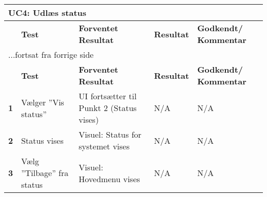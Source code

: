 
\begin{center}
\begin{longtable}{|p{}|p{}|p{}|p{}|p{}|} %
\hline
\multicolumn{5}{|l|}{\textbf{UC4: Udlæs status}} \\ \hline
\multicolumn{1}{|c|}{} &
\textbf{Test} &
\textbf{Forventet \newline Resultat} &
\textbf{Resultat} &
\textbf{Godkendt/ \newline Kommentar} \\ \hline 
\endfirsthead

\multicolumn{5}{l}{...fortsat fra forrige side} \\ \hline 
\multicolumn{1}{|c|}{} &
\textbf{Test} &
\textbf{Forventet \newline Resultat} &
\textbf{Resultat} &
\textbf{Godkendt/ \newline Kommentar} \\ \hline 
\endhead


\textbf{1} &
Vælger ''Vis status'' &
UI fortsætter til Punkt 2 (Status vises) &
N/A &
N/A \\\hline
\textbf{2} &
Status vises &
Visuel: Status for systemet vises &
N/A &
N/A \\\hline
\textbf{3} &
Vælg ''Tilbage'' fra status &
Visuel: Hovedmenu vises &
N/A &
N/A \\\hline
	\end{longtable}
	\label{ATUC4} 
\end{center}